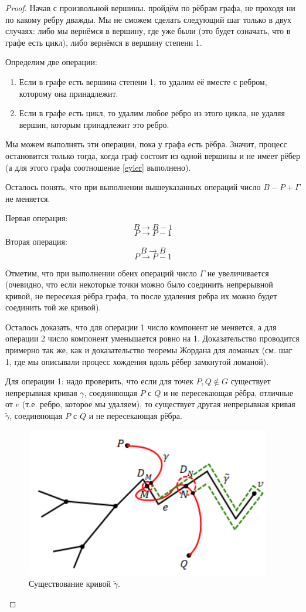 \begin{proof}
    Начав с произвольной вершины. пройдём по рёбрам графа, не проходя ни по какому ребру дважды. Мы не сможем сделать следующий шаг только в двух случаях: либо мы вернёмся в вершину, где уже были (это будет означать, что в графе есть цикл), либо вернёмся в вершину степени 1.

    Определим две операции:
    \begin{enumerate}
        \item Если в графе есть вершина степени 1, то удалим её вместе с ребром, которому она принадлежит.
        \item Если в графе есть цикл, то удалим любое ребро из этого цикла, не удаляя вершин, которым принадлежит это ребро.
    \end{enumerate}

    Мы можем выполнять эти операции, пока у графа есть рёбра. Значит, процесс остановится только тогда, когда граф состоит из одной вершины и не имеет рёбер (а для этого графа соотношение \eqref{eyler} выполнено).

    Осталось понять, что при выполнении вышеуказанных операций число $B - P + \Gamma$ не меняется.

    Первая операция: \[B \to B - 1\] \[P \to P - 1\]
    Вторая операция: \[B \to B\] \[P \to P - 1\]
    
    Отметим, что при выполнении обеих операций число $\Gamma$ не увеличивается (очевидно, что если некоторые точки можно было соединить непрерывной кривой, не пересекая рёбра графа, то после удаления ребра их можно будет соединить той же кривой).

    Осталось доказать, что для операции 1 число компонент не меняется, а для операции 2 число компонент уменьшается ровно на 1. Доказательство проводится примерно так же, как и доказательство теоремы Жордана для ломаных (см. шаг 1, где мы описывали процесс хождения вдоль рёбер замкнутой ломаной).

    Для операции 1: надо проверить, что если для точек $P,Q \notin G$ существует непрерывная кривая $\gamma$, соединяющая $P$ с $Q$ и не пересекающая рёбра, отличные от $e$ (т.е. ребро, которое мы удаляем), то существует другая непрерывная кривая $\tilde{\gamma}$, соединяющая $P$ с $Q$ и не пересекающая рёбра.

    \begin{figure}[h]
        \centering
        \includegraphics[scale=0.8]{images/c6.1.png}
        \caption{Существование кривой $\tilde{\gamma}$.}
        \label{fig:c6.1}
    \end{figure}


\end{proof}
